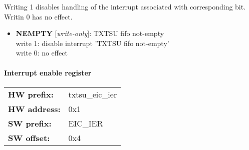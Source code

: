 \vspace{12pt}
Writing 1 disables handling of the interrupt associated with corresponding bit. Writin 0 has no effect.

\vspace{12pt}
\noindent
{}

\begin{itemize}
\item \begin{small}
{\bf 
NEMPTY
} [\emph{write-only}]: TXTSU fifo not-empty
\\
write 1: disable interrupt 'TXTSU fifo not-empty'\\write 0: no effect
\end{small}
\end{itemize}
\paragraph*{Interrupt enable register}\vspace{12pt}

\begin{tabular}{l l }
{\bf HW prefix:}  & txtsu\_eic\_ier\\
{\bf HW address:}  & 0x1\\
{\bf SW prefix:}  & EIC\_IER\\
{\bf SW offset:}  & 0x4\\
\end{tabular}

